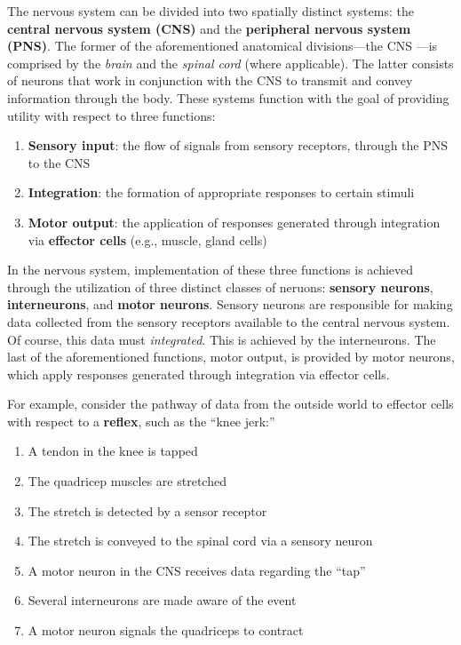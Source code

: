 \documentclass{article}
\begin{document}
The nervous system can be divided into two spatially distinct systems: the
\textbf{central nervous system (CNS)} and the \textbf{peripheral nervous
system (PNS)}. The former of the aforementioned anatomical divisions---the CNS
---is comprised by the \emph{brain} and the \emph{spinal cord} (where
applicable). The latter consists of neurons that work in conjunction with the
CNS to transmit and convey information through the body. These systems function
with the goal of providing utility with respect to three functions:

\begin{enumerate}
	\item \textbf{Sensory input}: the flow of signals from sensory receptors,
		through the PNS to the CNS
	\item \textbf{Integration}: the formation of appropriate responses to 
		certain stimuli
	\item \textbf{Motor output}: the application of responses generated through
		integration via \textbf{effector cells} (e.g., muscle, gland cells)
\end{enumerate}

In the nervous system, implementation of these three functions is achieved through
the utilization of three distinct classes of neruons: \textbf{sensory neurons},
\textbf{interneurons}, and \textbf{motor neurons}. Sensory neurons are
responsible for making data collected from the sensory receptors available to the
central nervous system. Of course, this data must \emph{integrated}. This is
achieved by the interneurons. The last of the aforementioned functions, motor output,
is provided by motor neurons, which apply responses generated through integration
via effector cells.

For example, consider the pathway of data from the outside world to effector cells
with respect to a \textbf{reflex}, such as the ``knee jerk:''

\begin{multicols}{2}
	\begin{enumerate}
		\item A tendon in the knee is tapped
		\item The quadricep muscles are stretched
		\item The stretch is detected by a sensor receptor
		\item The stretch is conveyed to the spinal cord via a sensory neuron
		\item A motor neuron in the CNS receives data regarding the ``tap''
		\item Several interneurons are made aware of the event
		\item A motor neuron signals the quadriceps to contract
	\end{enumerate}
\end{multicols}
\end{document}
